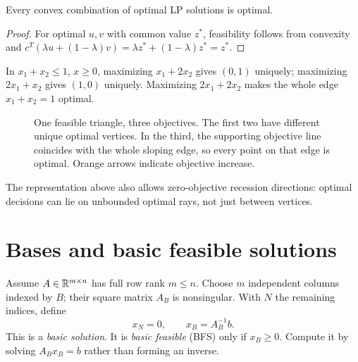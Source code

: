 \documentclass[11pt,a4paper]{article}
\begin{document}
\begin{proposition}
  Every convex combination of optimal LP solutions is optimal.
\end{proposition}
\begin{proof}
  For optimal $u,v$ with common value $z^*$, feasibility follows from convexity and
  $c^T(\lambda u+(1-\lambda)v)=\lambda z^*+(1-\lambda)z^*=z^*$.
\end{proof}
In $x_1+x_2\leq1$, $x\geq0$, maximizing $x_1+2x_2$ gives $(0,1)$ uniquely;
maximizing $2x_1+x_2$ gives $(1,0)$ uniquely. Maximizing $2x_1+2x_2$ makes the
whole edge $x_1+x_2=1$ optimal.
\begin{figure}[H]
  \centering
  \caption{One feasible triangle, three objectives. The first two have different
    unique optimal vertices. In the third, the supporting objective line coincides
    with the whole sloping edge, so every point on that edge is optimal. Orange
    arrows indicate objective increase.}\label{fig:optimal-edge}
\end{figure}

The representation above also allows zero-objective recession directions:
optimal decisions can lie on unbounded optimal rays, not just between vertices.

\section{Bases and basic feasible solutions}\label{sec:bases}
Assume $A\in\mathbb{R}^{m\times n}$ has full row rank $m\leq n$.
Choose $m$ independent columns indexed by $B$; their square matrix $A_B$ is
nonsingular. With $N$ the remaining indices, define
\[
  x_N=0,\qquad x_B=A_B^{-1}b.
\]
This is a \emph{basic solution}. It is \emph{basic feasible} (BFS) only if
$x_B\geq0$. Compute it by solving $A_Bx_B=b$ rather than forming an inverse.
\end{document}
